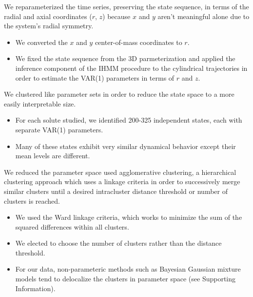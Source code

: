 \documentclass{article}
\begin{document}
  We reparameterized the time series, preserving the state sequence, in terms
  of the radial and axial coordinates ($r$, $z$) because $x$ and $y$ aren't 
  meaningful alone due to the system's radial symmetry.
  \begin{itemize}
    \item We converted the $x$ and $y$ center-of-mass coordinates to $r$.
    \item We fixed the state sequence from the 3D parmeterization and applied the
    inference component of the IHMM procedure to the cylindrical trajectories in
    order to estimate the VAR(1) parameters in terms of $r$ and $z$.
  \end{itemize} 
  
  \noindent We clustered like parameter sets in order to reduce the state space to
  a more easily interpretable size.
  \begin{itemize}
  	\item For each solute studied, we identified 200-325 independent states, each
   	with separate VAR(1) parameters.
   	\item Many of these states exhibit very similar dynamical behavior except their
   	mean levels are different.
  \end{itemize}
  
  We reduced the parameter space used agglomerative clustering, a hierarchical
  clustering approach which uses a linkage criteria in order to successively merge
  similar clusters until a desired intracluster distance threshold or number of
  clusters is reached. 
  \begin{itemize}
   	\item We used the Ward linkage criteria, which works to minimize the sum of
   	the squared differences within all clusters.
   	\item We elected to choose the number of clusters rather than the distance
   	threshold.
   	\item For our data, non-parameteric methods such as Bayesian Gaussian mixture
   	models tend to delocalize the clusters in parameter space (see Supporting
   	Information).
  \end{itemize}  
  
\end{document}

